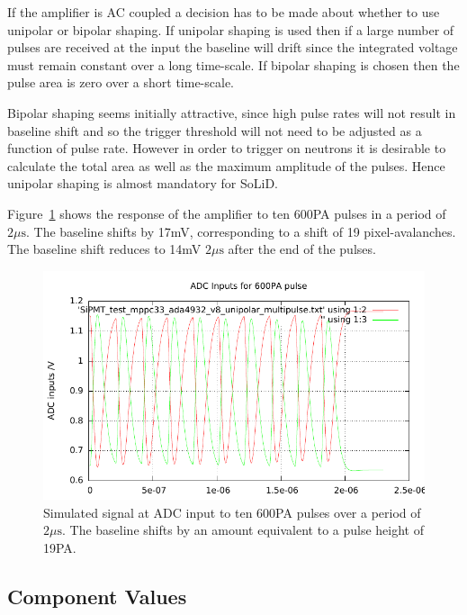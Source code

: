 \documentclass[
12pt, %
a4paper, %
oneside, %
headinclude,footinclude, %
apacite
]{scrartcl}
\begin{document}
If the amplifier is AC coupled a decision has to be made about whether to use unipolar or bipolar shaping. If unipolar shaping is used then if a large number of pulses are received at the input the baseline will drift since the integrated voltage must remain constant over a long time-scale. If bipolar shaping is chosen then the pulse area is zero over a short time-scale.

Bipolar shaping seems initially attractive, since high pulse rates will not result in baseline shift and so the trigger threshold will not need to be adjusted as a function of pulse rate. However in order to trigger on neutrons it is desirable to calculate the total area as well as the maximum amplitude of the pulses. Hence unipolar shaping is almost mandatory for SoLiD.

Figure~\ref{fig:amplifier_600pa_multipulse_response} shows the response of the amplifier to ten 600PA pulses in a period of $2\mu\mathrm{s}$. The baseline shifts by 17mV, corresponding to a shift of 19 pixel-avalanches. The baseline shift reduces to 14mV $2\mu\mathrm{s}$ after the end of the pulses.

\begin{figure}[tb]
\centering 
\includegraphics[width=\columnwidth]{SiPMT_test_mppc33_ada4932_v8_unipolar_multipulse.pdf}
\caption[Simulated signal at ADC input for ten 600PA pulses]{Simulated signal at ADC input to ten 600PA pulses over a period of $2\mu\mathrm{s}$. The baseline shifts by an amount equivalent to a pulse height of 19PA.}
\label{fig:amplifier_600pa_multipulse_response}
\end{figure}

\subsection{Component Values}
\end{document}
